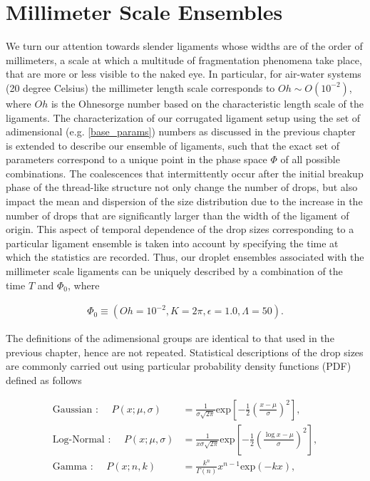 \section{Millimeter Scale Ensembles}

We turn our attention towards slender ligaments whose widths are of the 
order of millimeters, a scale at which a multitude of fragmentation phenomena
take place, that are more or less visible to the naked eye.
In particular, for air-water systems (20 degree Celsius) the millimeter length 
scale corresponds to $Oh \sim O(10^{-2})$, where $Oh$ is the Ohnesorge number
based on the characteristic length scale of the ligaments. 
The characterization of our corrugated ligament setup using the set of adimensional
(e.g. \eqref{base_params}) numbers as discussed in the previous chapter is extended 
to describe our ensemble of ligaments, such that the exact set of parameters
correspond to a unique point in the phase space $\Phi$ of all possible combinations. 
The coalescences that intermittently occur after the initial breakup phase of 
the thread-like structure not only change the number of drops, but also impact the 
mean and dispersion of the size distribution due to the increase in the number of drops that 
are significantly larger than the width of the ligament of origin.   
This aspect of temporal dependence of the drop sizes corresponding to a particular ligament ensemble
is taken into account by specifying the time at which the statistics are recorded. 
Thus, our droplet ensembles associated with the millimeter scale ligaments can be uniquely described 
by a combination of the time $T$ and $\Phi_0$, where

\begin{align}
	\Phi_0 \equiv \left( Oh=10^{-2}, K=2\pi, \epsilon=1.0, \Lambda=50 \right). 
\end{align}

The definitions of the adimensional groups are identical to that used
in the previous chapter, hence are not repeated.
Statistical descriptions of the drop sizes are commonly carried out using
particular probability density functions (PDF) defined as follows 



\begin{align}
	\text{Gaussian : } \quad P\left( x ; \mu , \sigma \right) &= 
	\frac{1}{\sigma \sqrt{2\pi}} \textrm{exp}\left[-\frac{1}{2}\left(\frac{x - \mu}{\sigma}\right)^2\right] \label{gauss},\\
	\text{Log-Normal : } \quad P\left( x ; \mu , \sigma \right) &= 
	\frac{1}{x \sigma \sqrt{2\pi}} \textrm{exp}\left[-\frac{1}{2}\left(\frac{\log x - \mu}{\sigma}\right)^2\right] \label{log_normal},\\
	\text{Gamma : } \quad P\left( x ; n,k \right) &= 
	\frac{k^{n}}{\Gamma(n)} x^{n-1} \textrm{exp}\left(-k x\right) \label{gamma}, 
\end{align}

